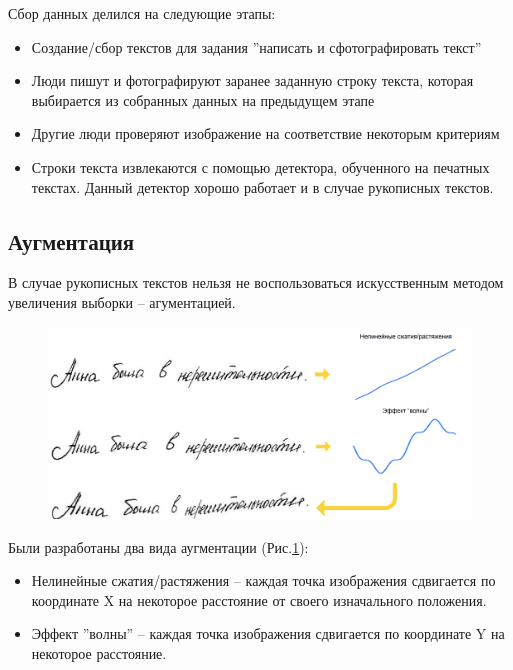\documentclass[12pt]{article}
\begin{document}
Сбор данных делился на следующие этапы:
\begin{itemize}
    \item Создание/сбор текстов для задания ''написать и сфотографировать текст''
    \item Люди пишут и фотографируют заранее заданную строку текста, которая выбирается из 
    собранных данных на предыдущем этапе
    \item Другие люди проверяют изображение на соответствие некоторым критериям
    \item Строки текста извлекаются с помощью детектора, обученного на печатных текстах. 
    Данный детектор хорошо работает и в случае рукописных текстов.
\end{itemize}

\subsection{Аугментация}

В случае рукописных текстов нельзя не воспользоваться искусственным методом увеличения выборки -- агументацией.

\begin{figure}[htb]
    \centering
    \includegraphics[width=\linewidth]{aug.png}
    \label{fig:aug}
\end{figure}

Были разработаны два вида аугментации (Рис.\ref{fig:aug}):

\begin{itemize}
    \item Нелинейные сжатия/растяжения -- каждая точка изображения сдвигается по координате X на некоторое расстояние от своего изначального положения.
    \item Эффект ''волны'' -- каждая точка изображения сдвигается по координате Y на некоторое расстояние.
\end{itemize}
\end{document}
